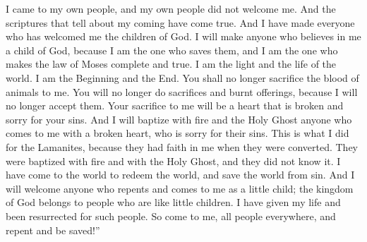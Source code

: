 I came to my own people, and my own people did not welcome me. And the scriptures that tell about my coming have come true.
\bverse \iffalse And as many as have received me, to them have I given to become the sons of God; and even so will I to as many as shall believe on my name, for behold, by me redemption cometh, and in me is the law of Moses fulfilled. \fi
And I have made everyone who has welcomed me the children of God. I will make anyone who believes in me a child of God, because I am the one who saves them, and I am the one who makes the law of Moses complete and true.
\bverse \iffalse I am the light and the life of the world. I am Alpha and Omega, the beginning and the end. \fi
I am the light and the life of the world. I am the Beginning and the End.
\bverse \iffalse And ye shall offer up unto me no more the shedding of blood; yea, your sacrifices and your burnt offerings shall be done away, for I will accept none of your sacrifices and your burnt offerings. \fi
You shall no longer sacrifice the blood of animals to me. You will no longer do sacrifices and burnt offerings, because I will no longer accept them.
\bverse \iffalse And ye shall offer for a sacrifice unto me a broken heart and a contrite spirit. And whoso cometh unto me with a broken heart and a contrite spirit, him will I baptize with fire and with the Holy Ghost, even as the Lamanites, because of their faith in me at the time of their conversion, were baptized with fire and with the Holy Ghost, and they knew it not. \fi
Your sacrifice to me will be a heart that is broken and sorry for your sins. And I will baptize with fire and the Holy Ghost anyone who comes to me with a broken heart, who is sorry for their sins. This is what I did for the Lamanites, because they had faith in me when they were converted. They were baptized with fire and with the Holy Ghost, and they did not know it.
\bverse \iffalse Behold, I have come unto the world to bring redemption unto the world, to save the world from sin. \fi
I have come to the world to redeem the world, and save the world from sin.
\bverse \iffalse Therefore, whoso repenteth and cometh unto me as a little child, him will I receive, for of such is the kingdom of God.  Behold, for such I have laid down my life, and have taken it up again; therefore repent, and come unto me ye ends of the earth, and be saved. \fi
And I will welcome anyone who repents and comes to me as a little child; the kingdom of God belongs to people who are like little children. I have given my life and been resurrected for such people. So come to me, all people everywhere, and repent and be saved!''
